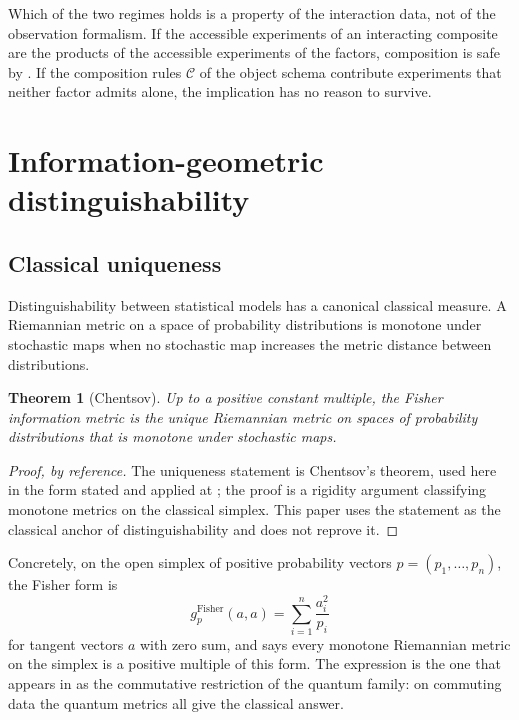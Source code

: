 \documentclass[11pt,letterpaper]{article}
\newtheorem{theorem}{Theorem}[section]
\theoremstyle{definition}
\theoremstyle{remark}
\begin{document}
Which of the two regimes holds is a property of the interaction data, not of the observation formalism. If the accessible experiments of an interacting composite are the products of the accessible experiments of the factors, composition is safe by . If the composition rules $\mathcal{C}$ of the object schema contribute experiments that neither factor admits alone, the implication has no reason to survive.

\section{Information-geometric distinguishability}
\label{sec:metrics}

\subsection{Classical uniqueness}

Distinguishability between statistical models has a canonical classical measure. A Riemannian metric on a space of probability distributions is monotone under stochastic maps when no stochastic map increases the metric distance between distributions.

\begin{theorem}[Chentsov]
\label{thm:chentsov}
Up to a positive constant multiple, the Fisher information metric is the unique Riemannian metric on spaces of probability distributions that is monotone under stochastic maps.
\end{theorem}

\begin{proof}[Proof, by reference]
The uniqueness statement is Chentsov's theorem, used here in the form stated and applied at \cite{b8}; the proof is a rigidity argument classifying monotone metrics on the classical simplex. This paper uses the statement as the classical anchor of distinguishability and does not reprove it.
\end{proof}

Concretely, on the open simplex of positive probability vectors $p = (p_1, \ldots, p_n)$, the Fisher form is
\[
g^{\mathrm{Fisher}}_p(a, a) = \sum_{i=1}^{n} \frac{a_i^2}{p_i}
\]
for tangent vectors $a$ with zero sum, and  says every monotone Riemannian metric on the simplex is a positive multiple of this form. The expression is the one that appears in  as the commutative restriction of the quantum family: on commuting data the quantum metrics all give the classical answer.
\end{document}
